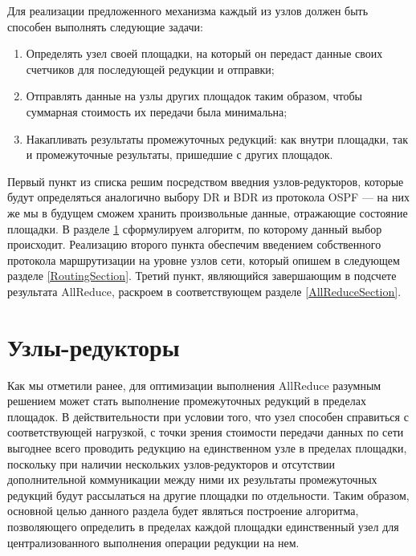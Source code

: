 Для реализации предложенного механизма каждый из узлов должен быть способен выполнять следующие задачи:

\begin{enumerate}
    \item Определять узел своей площадки, на который он передаст данные своих счетчиков для последующей редукции и отправки;
    
    \item Отправлять данные на узлы других площадок таким образом, чтобы суммарная стоимость их передачи была минимальна;
    
    \item Накапливать результаты промежуточных редукций: как внутри площадки, так и промежуточные результаты, пришедшие с других площадок.
\end{enumerate}

Первый пункт из списка решим посредством введния узлов-редукторов, которые будут определяться аналогично выбору DR и BDR из протокола OSPF \cite[с.~75]{RFC2328} --- на них же мы в будущем сможем хранить произвольные данные, отражающие состояние площадки. В разделе \ref{ReducersSection} сформулируем алгоритм, по которому данный выбор происходит. Реализацию второго пункта обеспечим введением собственного протокола маршрутизации на уровне узлов сети, который опишем в следующем разделе \ref{RoutingSection}. Третий пункт, являющийся завершающим в подсчете результата AllReduce, раскроем в соответствующем разделе \ref{AllReduceSection}.

\section{Узлы-редукторы}
\label{ReducersSection}

Как мы отметили ранее, для оптимизации выполнения AllReduce разумным решением может стать выполнение промежуточных редукций в пределах площадок. В действительности при условии того, что узел способен справиться с соответствующей нагрузкой, с точки зрения стоимости передачи данных по сети выгоднее всего проводить редукцию на единственном узле в пределах площадки, поскольку при наличии нескольких узлов-редукторов и отсутствии дополнительной коммуникации между ними их результаты промежуточных редукций будут рассылаться на другие площадки по отдельности. Таким образом, основной целью данного раздела будет являться построение алгоритма, позволяющего определить в пределах каждой площадки единственный узел для централизованного выполнения операции редукции на нем.

